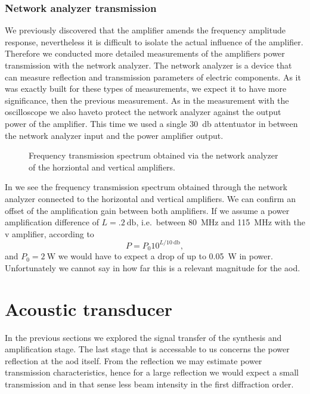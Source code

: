 \subsubsection{Network analyzer transmission}

We previously discovered that the amplifier amends the frequency amplitude
response, nevertheless it is difficult to isolate the actual influence of
the amplifier. Therefore we conducted more detailed measurements of the
amplifiers power transmission with the network analyzer. The network analyzer
is a device that can measure reflection and transmission parameters of
electric components. As it was exactly built for these types of measurements,
we expect it to have more significance, then the previous measurement. As in
the measurement with the oscilloscope we also haveto protect the network
analyzer against the output power of the amplifier. This time we used a
single \SI{30}{\decibel} attentuator in between the network analyzer input
and the power amplifier output.
\begin{figure}[htb]
  \centering
  \begin{adjustbox}{width=\textwidth}
    
  \end{adjustbox}
  \caption{Frequency transmission spectrum obtained via the network analyzer
    of the horziontal and vertical amplifiers.
  }\label{fig:signal_amplification_spectrum}
\end{figure}
In  we see the frequency transmission
spectrum obtained through the network analyzer connected to the horizontal
and vertical amplifiers. We can confirm an offset of the amplification
gain between both amplifiers. If we assume a power amplification
difference of $L=\SI{.2}{\decibel}$, i.e.\ between \SI{80}{\mega\hertz} and
\SI{115}{\mega\hertz} with the \gls{v} amplifier, according to
\begin{equation}
  P
  =
  P_0 10^{L/\SI{10}{\decibel}}
  \label{eq:power_gain_decibel},
\end{equation}
and $P_0=\SI{2}{\watt}$ we would have to expect a drop of up to
\SI{.05}{\watt} in power. Unfortunately we cannot say in how far this is
a relevant magnitude for the \gls{aod}.

\section{Acoustic transducer}

In the previous sections we explored the signal transfer of the synthesis
and amplification stage. The last stage that is accessable to us concerns the
power reflection at the \gls{aod} itself. From the reflection we may estimate
power transmission characteristics, hence for a large reflection we would
expect a small transmission and in that sense less beam intensity in the first
diffraction order.

